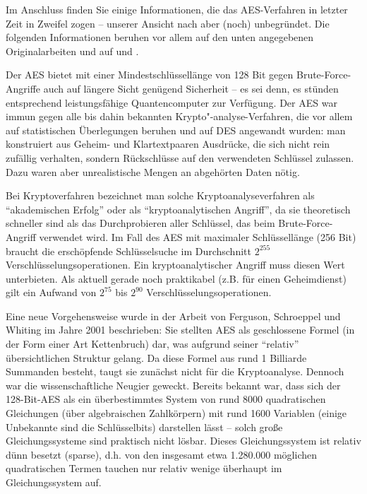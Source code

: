 \begin{refsegment}
Im Anschluss finden Sie einige Informationen, die das AES-Verfahren in
letzter Zeit in Zweifel zogen -- unserer Ansicht nach aber (noch)
unbegründet. Die folgenden Informationen beruhen vor allem auf den unten
angegebenen Originalarbeiten und auf \cite{Wobst2002} und
\cite{Lucks2002}.

Der AES bietet mit einer Mindestschlüssellänge von 128 Bit gegen
Brute-Force-Angriffe auch auf längere Sicht genügend Sicherheit -- es sei
denn, es stünden entsprechend leistungsfähige Quantencomputer zur
Verfügung. Der AES war immun gegen alle bis dahin bekannten
Krypto"-analyse-Verfahren, die vor allem auf statistischen
Überlegungen beruhen und auf DES angewandt wurden: man konstruiert aus
Geheim- und Klartextpaaren Ausdrücke, die sich nicht rein zufällig
verhalten, sondern Rückschlüsse auf den verwendeten Schlüssel zulassen.
Dazu waren aber unrealistische Mengen an abgehörten Daten nötig.

Bei Kryptoverfahren bezeichnet man solche Kryptoanalyseverfahren als
"`akademischen Erfolg"' oder als "`kryptoanalytischen Angriff"', da sie
theoretisch schneller sind als das Durchprobieren aller Schlüssel, das
beim Brute-Force-Angriff verwendet wird. Im
Fall des AES mit maximaler Schlüssellänge (256 Bit) braucht die
erschöpfende Schlüsselsuche im Durchschnitt $2^{255}$
Verschlüsselungsoperationen. Ein kryptoanalytischer Angriff muss diesen
Wert unterbieten. Als aktuell gerade noch praktikabel (z.B. für einen
Geheimdienst) gilt ein Aufwand von $2^{75}$ bis $2^{90}$
Verschlüsselungsoperationen.

Eine neue Vorgehensweise wurde in der Arbeit von Ferguson, Schroeppel
und Whiting im Jahre 2001 \cite{Ferguson2001} beschrieben: Sie stellten
AES als geschlossene Formel (in der Form einer Art Kettenbruch) dar,
was aufgrund seiner "`relativ"' übersichtlichen Struktur gelang. Da
diese Formel aus rund 1 Billiarde Summanden besteht, taugt sie zunächst
nicht für die Kryptoanalyse. Dennoch war die wissenschaftliche Neugier
geweckt. Bereits bekannt war, dass sich der 128-Bit-AES als ein
überbestimmtes System von rund 8000 quadratischen Gleichungen
(über algebraischen Zahlkörpern) mit rund 1600 Variablen (einige
Unbekannte sind die Schlüsselbits) darstellen lässt -- solch große
Gleichungssysteme sind praktisch nicht lösbar. Dieses Gleichungssystem
ist relativ dünn besetzt (\glqq sparse\grqq), d.h. von den insgesamt etwa
1.280.000 möglichen quadratischen Termen tauchen nur relativ wenige
überhaupt im Gleichungssystem auf.


\end{refsegment}
